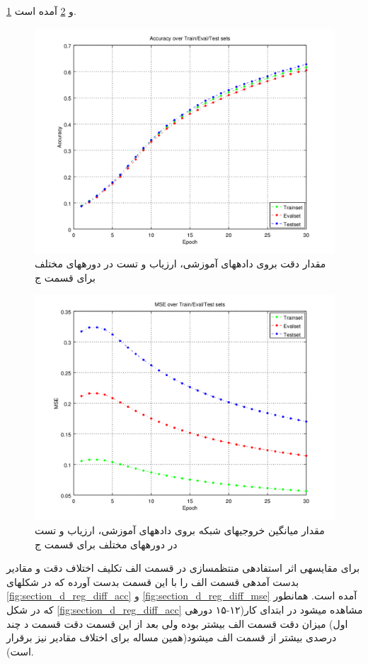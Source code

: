 \documentclass[10pt,a4paper]{article}
\newcommand{\نیمفاصله}{\halfspace}
\renewcommand{\ }{\halfspace}
\newcommand{\بپ}{انتشار-به-عقب }
\newcommand{\منست}{\lr{MNIST} }
\newcommand{\مسی}{\lr{MSE} }
\newcommand{\فوتنت}[1]{\footnote{\lr{#1}}}
\begin{document}
\ref{fig:section_d_reg_acc} و \ref{fig:section_d_reg_mse}
آمده است.
\newpage
\begin{figure}
\centering
\includegraphics[width=.9\textwidth]{4_reg_acc}
\caption{مقدار دقت بروی داده\ های آموزشی، ارزیاب و تست در دوره\ های مختلف برای قسمت ج}\label{fig:section_d_reg_acc}
\end{figure}
\begin{figure}
\centering
\includegraphics[width=.9\textwidth]{4_reg_mse}
\caption{مقدار میانگین \مسی خروجی\ های شبکه بروی داده\ های آموزشی، ارزیاب و تست در دوره\ های مختلف برای قسمت ج}\label{fig:section_d_reg_mse}
\end{figure}
برای مقایسه\ ی اثر استفاده\ ی منتظم\ سازی در قسمت الف تکلیف اختلاف دقت و مقادیر \مسی بدست آمده\ ی قسمت الف را با این قسمت بدست آورده که در شکل\ های
\ref{fig:section_d_reg_diff_acc} و \ref{fig:section_d_reg_diff_mse}
آمده است. همان\ طور که در شکل
\ref{fig:section_d_reg_diff_acc}
مشاهده می\ شود در ابتدای کار(۱۲-۱۵ دوره\ ی اول) میزان دقت قسمت الف بیشتر بوده ولی بعد از این قسمت دقت قسمت د چند درصدی بیشتر از قسمت الف می\ شود(همین مساله برای اختلاف مقادیر \مسی نیز برقرار است).
\end{document}
